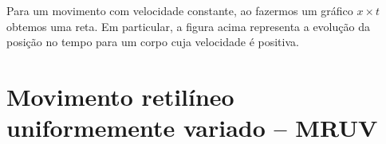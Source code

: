 \begin{marginfigure}[2cm]
\centering
{}
\caption{Para um movimento com velocidade constante, ao fazermos um gráfico $x \times t$ obtemos uma reta. Em particular, a figura acima representa a evolução da posição no tempo para um corpo cuja velocidade é positiva.\label{Fig:GraficoRetaParaMovimentoComVelocidadeConstante}}
\end{marginfigure}

\section{Movimento retilíneo uniformemente variado -- MRUV}

